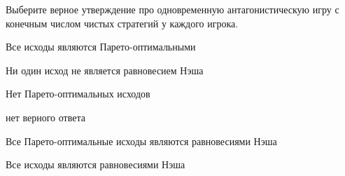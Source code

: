 
\begin{question}
Выберите верное утверждение про одновременную антагонистическую игру с
конечным числом чистых стратегий у каждого игрока.
\begin{answerlist}
  \item Все исходы являются Парето-оптимальными
  \item Ни один исход не является равновесием Нэша
  \item Нет Парето-оптимальных исходов
  \item нет верного ответа
  \item Все Парето-оптимальные исходы являются равновесиями Нэша
  \item Все исходы являются равновесиями Нэша
\end{answerlist}
\end{question}


